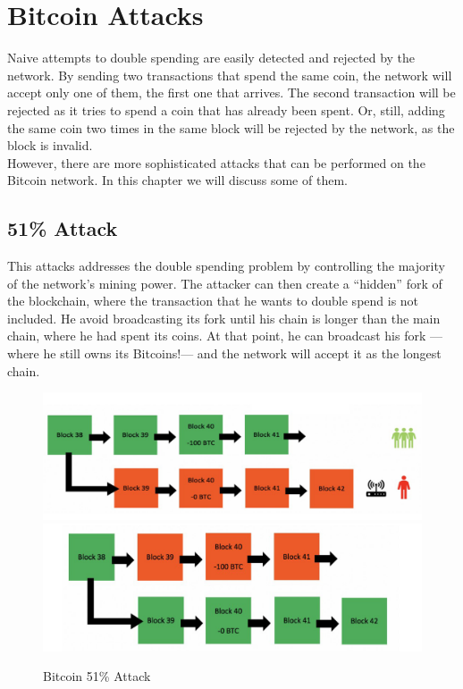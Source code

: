 \chapter{Bitcoin Attacks}

Naive attempts to double spending are easily detected and rejected by the network.
By sending two transactions that spend the same coin, the network will accept only one of them, the first one that arrives. The second transaction will be rejected as it tries to spend a coin that has already been spent.
Or, still, adding the same coin two times in the same block will be rejected by the network, as the block is invalid.\\
However, there are more sophisticated attacks that can be performed on the Bitcoin network. In this chapter we will discuss some of them.

\section{51\% Attack}
\label{sec:51-attack}
\begin{paracol}{2}
   \colfill
   This attacks addresses the double spending problem by controlling the majority of the network's mining power.
   The attacker can then create a ``hidden'' fork of the blockchain, where the transaction that he wants to double spend is not included.
   He avoid broadcasting its fork until his chain is longer than the main chain, where he had spent its coins. At that point, he can broadcast his fork ---where he still owns its Bitcoins!--- and the network will accept it as the longest chain.
   \colfill
   \switchcolumn

   \begin{figure}[htbp]
      \centering
      \includegraphics{images/bitcoin_atk511.png}\\
      \includegraphics{images/bitcoin_atk512.png}
      \caption{Bitcoin 51\% Attack}
      \label{fig:bitcoin_atk51}
   \end{figure}
\end{paracol}

